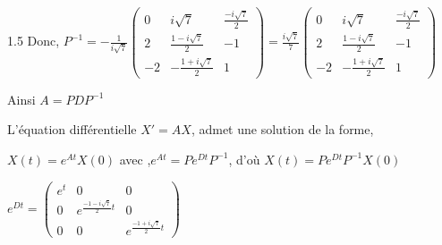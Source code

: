 \documentclass[12pt]{article}
\begin{document}
\begin{spacing}{1.5}
Donc, $P^{-1}=-\frac{1}{i\sqrt{7}}\begin{pmatrix}
0 & i\sqrt{7} & \frac{-i\sqrt{7}}{2} \\ 
2 & \frac{1-i\sqrt{7}}{2} & -1 \\ 
-2 & -\frac{1+i\sqrt{7}}{2} & 1
\end{pmatrix}=\frac{i\sqrt{7}}{7}\begin{pmatrix}
0 & i\sqrt{7} & \frac{-i\sqrt{7}}{2} \\ 
2 & \frac{1-i\sqrt{7}}{2} & -1 \\ 
-2 & -\frac{1+i\sqrt{7}}{2} & 1
\end{pmatrix}$

Ainsi $A=PDP^{-1}$

\medskip
L'équation différentielle $X'=AX$, admet une solution de la forme,

$X(t)=e^{At}X(0)$ avec ,$e^{At}=Pe^{Dt}P^{-1}$, d'où $X(t)=Pe^{Dt}P^{-1}X(0)$ 

$e^{Dt}=\begin{pmatrix}
e^t & 0 & 0 \\ 
0 & e^{\frac{-1-i\sqrt{7}}{2}t} & 0 \\ 
0 & 0 & e^{\frac{-1+i\sqrt{7}}{2}t}
\end{pmatrix}$






\end{spacing}
\end{document}
